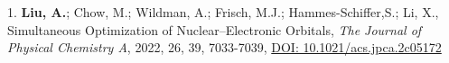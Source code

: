 \begin{cvpublications}

\cvpublication
{1.} 
{\textbf{Liu, A.}; Chow, M.; Wildman, A.; Frisch, M.J.; Hammes-Schiffer,S.; Li, X., 
Simultaneous Optimization of Nuclear–Electronic Orbitals,  
\textit{The Journal of Physical Chemistry A}, 2022, 26, 39, 7033-7039, 
\href{https://pubs.acs.org/doi/10.1021/acs.jpca.2c05172}{DOI: 10.1021/acs.jpca.2c05172}} 
 





\end{cvpublications}
\vspace{-1cm}

